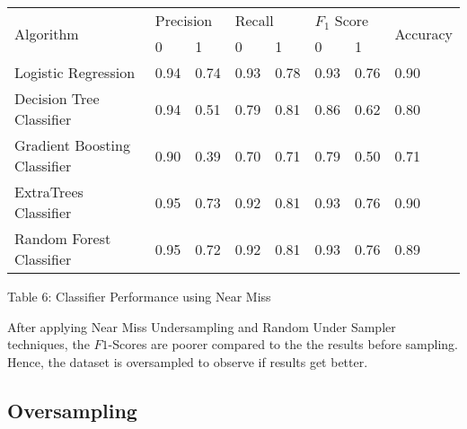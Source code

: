 \documentclass[12pt,letter-paper]{article}
\begin{document}
        \begin{table}[H]
    \begin{center}
        \begin{tabular}{|l|l|l|l|l|l|l|l|}
            \hline
            \multirow{2}{*}{Algorithm} & \multicolumn{2}{l|}{Precision} & \multicolumn{2}{l|}{Recall} & \multicolumn{2}{l|}{$F_1$ Score} & \multirow{2}{*}{Accuracy} \\ \cline{2-7}
                               & 0              & 1             & 0            & 1            & 0             & 1             &                           \\ \hline
        Logistic Regression         & 0.94           & 0.74          & 0.93         & 0.78         & 0.93          & 0.76          & 0.90                     \\ \hline
        Decision Tree Classifier         & 0.94           & 0.51          & 0.79         & 0.81         & 0.86          & 0.62          & 0.80                      \\ \hline
        Gradient Boosting Classifier & 0.90           & 0.39          & 0.70         & 0.71         & 0.79          & 0.50          & 0.71                      \\ \hline
        ExtraTrees Classifier       & 0.95           & 0.73          & 0.92         & 0.81         & 0.93          & 0.76          & 0.90                      \\ \hline
        Random Forest Classifier     & 0.95           & 0.72          & 0.92         & 0.81         & 0.93          & 0.76          & 0.89                      \\ \hline
        \end{tabular}
    \end{center}
    \begin{center}
    Table 6: Classifier Performance using Near Miss 
        \end{center}
        
    After applying Near Miss Undersampling and Random Under Sampler techniques, the $F1$-Scores are poorer compared to the the results before sampling. Hence, the dataset is oversampled to observe if results get better.
    
    \end{table}
    
    \subsection{Oversampling}
    
\end{document}
